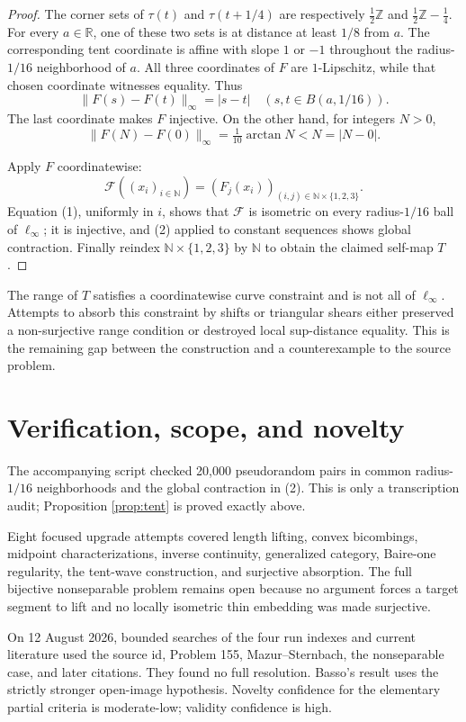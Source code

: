 \documentclass[11pt]{article}
\newcommand{\R}{\mathbb R}
\newcommand{\N}{\mathbb N}
\begin{document}
\begin{proof}
The corner sets of $\tau(t)$ and $\tau(t+1/4)$ are respectively
$\frac12\mathbb Z$ and $\frac12\mathbb Z-\frac14$.  For every $a\in\R$,
one of these two sets is at distance at least $1/8$ from $a$.  The
corresponding tent coordinate is affine with slope $1$ or $-1$ throughout
the radius-$1/16$ neighborhood of $a$.  All three coordinates of $F$ are
$1$-Lipschitz, while that chosen coordinate witnesses equality.  Thus
\[
 \|F(s)-F(t)\|_\infty=|s-t|
 \quad(s,t\in B(a,1/16)).                              \tag{1}
\]
The last coordinate makes $F$ injective.  On the other hand, for integers
$N>0$,
\[
 \|F(N)-F(0)\|_\infty=\tfrac1{10}\arctan N<N=|N-0|.   \tag{2}
\]

Apply $F$ coordinatewise:
\[
 \mathcal F((x_i)_{i\in\N})=(F_j(x_i))_{(i,j)\in\N\times\{1,2,3\}}.
\]
Equation (1), uniformly in $i$, shows that $\mathcal F$ is isometric on
every radius-$1/16$ ball of $\ell_\infty$; it is injective, and (2) applied
to constant sequences shows global contraction.  Finally reindex
$\N\times\{1,2,3\}$ by $\N$ to obtain the claimed self-map $T$.
\end{proof}

The range of $T$ satisfies a coordinatewise curve constraint and is not all
of $\ell_\infty$.  Attempts to absorb this constraint by shifts or triangular
shears either preserved a non-surjective range condition or destroyed local
sup-distance equality.  This is the remaining gap between the construction
and a counterexample to the source problem.

\section{Verification, scope, and novelty}

The accompanying script checked 20,000 pseudorandom pairs in common
radius-$1/16$ neighborhoods and the global contraction in (2).  This is only
a transcription audit; Proposition \ref{prop:tent} is proved exactly above.

Eight focused upgrade attempts covered length lifting, convex bicombings,
midpoint characterizations, inverse continuity, generalized category,
Baire-one regularity, the tent-wave construction, and surjective absorption.
The full bijective nonseparable problem remains open because no argument
forces a target segment to lift and no locally isometric thin embedding was
made surjective.

On 12 August 2026, bounded searches of the four run indexes and current
literature used the source id, Problem 155, Mazur--Sternbach, the
nonseparable case, and later citations.  They found no full resolution.
Basso's result uses the strictly stronger open-image hypothesis.
Novelty confidence for the elementary partial criteria is moderate-low;
validity confidence is high.
\end{document}
